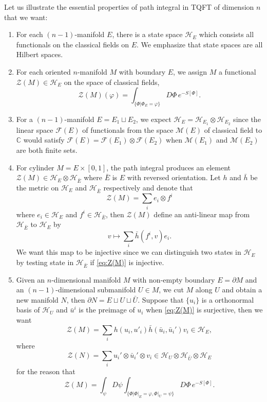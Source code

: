 \documentclass[10pt,reqno,final]{article}
\numberwithin{equation}{section}
\numberwithin{figure}{section}
\numberwithin{table}{section}
\theoremstyle{plain}
\theoremstyle{definition}
\theoremstyle{remark}
\begin{document}
    Let us illustrate the essential properties of path integral in TQFT of dimension \(n\) that we want:
    \begin{enumerate}[(1)]
      \item For each \((n-1)\)-manifold \(E\), there is a state space \(\mathcal{H}_{E}\) which consists all functionals on the classical fields on \(E\). We emphasize that state spaces are all Hilbert spaces.
      \item For each oriented \(n\)-manifold \(M\) with boundary \(E\), we assign \(M\) a functional \(\mathcal{Z}(M)\in \mathcal{H}_{E}\) on the space of classical fields, \[
        \mathcal{Z}(M)(\varphi)=\int_{\{ \Phi|\Phi_{E}=\varphi \}}D\Phi\,e^{-S[\Phi]}.
      \]
      \item For a \((n-1)\)-manifold \(E=E_1\sqcup E_2  \), we expect \(\mathcal{H}_{E}=\mathcal{H}_{E_1}\otimes \mathcal{H}_{E_2}\) since the linear space \(\mathcal{F}(E)\) of functionals from the space \(\mathcal{M}(E)\) of classical field to \(\mathbb{C}\) would satisfy \(\mathcal{F}(E)=\mathcal{F}(E_1)\otimes \mathcal{F}(E_2)\) when \(\mathcal{M}(E_1)\) and \(\mathcal{M}(E_2)\) are both finite sets.
      \item \label{enum:duality} For cylinder \(M=E\times [0,1]\), the path integral produces an element \(\mathcal{Z}(M)\in \mathcal{H}_{E }\otimes \mathcal{H}_{\bar{E}}\) where \(\bar{E}\) is \(E\) with reversed orientation. Let \(h\) and \(\bar{h}\) be the metric on \(\mathcal{H}_{E}\) and \(\mathcal{H}_{\bar{E}}\) respectively and denote that \[
        \mathcal{Z}(M )=\sum_{i}e_{i}\otimes f^{i}
      \]
      where \(e_{i}\in \mathcal{H}_{E }\) and \(f^{i}\in \mathcal{H}_{\bar{E}}\), then \(\mathcal{Z}(M )\) define an anti-linear map from \(\mathcal{H}_{\bar{E}}\) to \(\mathcal{H}_{E }\) by 
      \begin{equation}\label{eq:Z(M)}
        v\mapsto \sum_{i} \bar{h}(f^{i},v )e_{i}. 
      \end{equation}
      We want this map to be injective since we can distinguish two states in \(\mathcal{H}_{E }\) by testing state in \(\mathcal{H}_{\bar{E}}\) if \eqref{eq:Z(M)} is injective.
      \item \label{enum:intermediate} Given an \(n\)-dimensional manifold \(M\) with non-empty boundary \(E=\partial M \) and an \((n-1)\)-dimensional submanifold \(U\in M \), we cut \(M\) along \(U\) and obtain a new manifold \(N\), then \(\partial N=E\sqcup U\sqcup \bar{U}\). Suppose that \(\{ u_{i} \}\) is a orthonormal basis of \(\mathcal{H}_{U}\) and \(\bar{u}^{i}\) is the preimage of \(u_{i}\) when \eqref{eq:Z(M)} is surjective, then we want 
      \begin{equation}
        \mathcal{Z}(M)=\sum_{i}h(u_{i},u'_{i})\bar{h}(\bar{u}_{i},\bar{u}_{i}')v_{i}\in \mathcal{H}_{E},
      \end{equation}
      where
      \[
        \mathcal{Z}(N)=\sum_{i}u_{i}'\otimes \bar{u}_{i}'\otimes v_{i}\in \mathcal{H}_{U}\otimes \mathcal{H}_{\bar{U}}\otimes \mathcal{H}_{E}
      \]
      for the reason that
      \[
        \mathcal{Z}(M)=\int_{\psi}D\psi\int_{\{ \Phi|\Phi|_{E}=\varphi,\Phi|_{U}=\psi \}}D\Phi\,e^{-S[\Phi]}.
      \]
    \end{enumerate}
\end{document}
